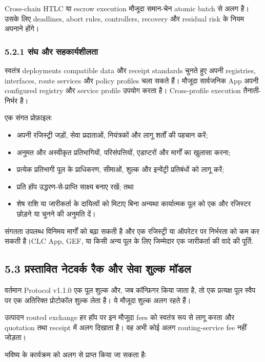 \documentclass[11pt]{article}
\begin{document}
Cross-chain HTLC या escrow execution मौजूदा समान-चेन atomic batch से अलग है। उसके लिए deadlines, abort rules, controllers, recovery और residual risk के नियम अपनाने होंगे।

\subsubsection*{5.2.1 संघ और सहकार्यशीलता}

स्वतंत्र deployments compatible data और receipt standards चुनते हुए अपनी registries, interfaces, route services और policy profiles चला सकते हैं। मौजूदा सार्वजनिक App अपनी configured registry और service profile उपयोग करता है। Cross-profile execution तैनाती-निर्भर है।

एक संगत प्रोफ़ाइलः

\begin{itemize}[leftmargin=*]
\item अपनी रजिस्ट्री जड़ों, सेवा प्रदाताओं, नियंत्रकों और लागू शर्तों की पहचान करें;
\item अनुमत और अस्वीकृत प्रतिभागियों, परिसंपत्तियों, एडाप्टरों और मार्गों का खुलासा करना;
\item प्रत्येक प्रतिभागी पूल के प्राधिकरण, सीमाओं, शुल्क और इन्वेंट्री प्रतिबंधों को लागू करें;
\item प्रति हॉप उद्धरण-से-प्राप्ति साक्ष्य बनाए रखें; तथा
\item शेष राशि या जारीकर्ता के दायित्वों को मिटाए बिना अन्यथा कार्यात्मक पूल को एक और रजिस्टर छोड़ने या चुनने की अनुमति दें।
\end{itemize}
संगतता उपलब्ध विनिमय मार्गों को बढ़ा सकती है और एक रजिस्ट्री या ऑपरेटर पर निर्भरता को कम कर सकती है।CLC App, GEF, या किसी अन्य पूल के लिए जिम्मेदार एक जारीकर्ता की वादे की पूर्ति.

\subsection*{5.3 प्रस्तावित नेटवर्क रैक और सेवा शुल्क मॉडल}

वर्तमान Protocol v1.1.0 एक पूल शुल्क और, जब कॉन्फ़िगर किया जाता है, तो एक प्रत्यक्ष पूल स्वैप पर एक अतिरिक्त प्रोटोकॉल शुल्क लेता है। ये मौजूदा शुल्क अलग रहते हैं।

उत्पादन routed exchange हर हॉप पर इन मौजूदा fees को स्वतंत्र रूप से लागू करता और quotation तथा receipt में अलग दिखाता है। वह अभी कोई अलग routing-service fee नहीं जोड़ता।

भविष्य के कार्यक्रम को अलग से प्राप्त किया जा सकता हैः
\end{document}
